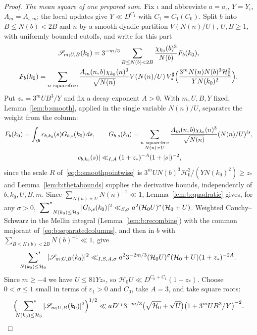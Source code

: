 \begin{proof}
\emph{The mean square of one prepared sum.} Fix $\iota$ and abbreviate $a=a_\iota$, $Y=Y_\iota$, $A_m=A_{\iota,m}$; the local updates give $Y\ll D^{C_1}$ with $C_1=C_1(C_0)$. Split $b$ into $B\le N(b)<2B$ and $n$ by a smooth dyadic partition $V(N(n)/U)$, $U,B\ge1$, with uniformly bounded cutoffs, and write for this part
\[
  \begin{gathered}
  \mathscr S_{m;U,B}(k_0)=3^{-m/3}\sum_{B\le N(b)<2B}\frac{\chi_{k_0}(b)^3}{N(b)}F_b(k_0),\\
  F_b(k_0)=\sum_{n\ {\rm squarefree}}\frac{A_m(n,b)\chi_{k_0}(n)^3}{\sqrt{N(n)}}V(N(n)/U)\,V_*^\sharp\Bigl(\frac{3^mN(n)N(b)^3\mathcal H_0^2}{YN(k_0)^2}\Bigr).
  \end{gathered}
\]
Put $z_*=3^mUB^3/Y$ and fix a decay exponent $A>0$. With $m,U,B,Y$ fixed, Lemma~\ref{lem:b:smooth}, applied in the single variable $N(n)/U$, separates the weight from the column:
\begin{equation}\label{eq:b:separatedcolumns}
  \begin{gathered}
  F_b(k_0)=\int_\R c_{b,k_0}(s)G_{b,s}(k_0)\dd s,\qquad G_{b,s}(k_0)=\sum_{\substack{n\ {\rm squarefree}\\N(n)\asymp U}}\frac{A_m(n,b)\chi_{k_0}(n)^3}{\sqrt{N(n)}}(N(n)/U)^{is},\\
  |c_{b,k_0}(s)|\ll_{I,A}(1+z_*)^{-A}(1+|s|)^{-2},
  \end{gathered}
\end{equation}
since the scale $R$ of~\eqref{eq:b:smoothpointwise} is $3^mUN(b)^3\mathcal H_0^2/(YN(k_0)^2)\ge z_*$ and Lemma~\ref{lem:b:thetabounds} supplies the derivative bounds, independently of $b,k_0,U,B,m$. Since $\sum_{N(n)\asymp U}N(n)^{-1}\ll1$, Lemma~\ref{lem:b:quadratic} gives, for any $\sigma>0$, $\sideset{}{^*}\sum_{N(k_0)\le\mathcal H_0}|G_{b,s}(k_0)|^2\ll_{S,\sigma}a^2(\mathcal H_0U)^\sigma(\mathcal H_0+U)$. Weighted Cauchy--Schwarz in the Mellin integral (Lemma~\ref{lem:b:recombine}) with the common majorant of~\eqref{eq:b:separatedcolumns}, and then in $b$ with $\sum_{B\le N(b)<2B}N(b)^{-1}\ll1$, give
\begin{equation}\label{eq:b:preparedms}
  \sideset{}{^*}\sum_{N(k_0)\le\mathcal H_0}|\mathscr S_{m;U,B}(k_0)|^2\ll_{I,S,A,\sigma}a^23^{-2m/3}(\mathcal H_0U)^\sigma(\mathcal H_0+U)(1+z_*)^{-2A}.
\end{equation}
Since $m\ge-4$ we have $U\le81Yz_*$, so $\mathcal H_0U\ll D^{C_0+C_1}(1+z_*)$. Choose $0<\sigma\le1$ small in terms of $\varepsilon_1>0$ and $C_0$, take $A=3$, and take square roots:
\[
  \Bigl(\sideset{}{^*}\sum_{N(k_0)\le\mathcal H_0}|\mathscr S_{m;U,B}(k_0)|^2\Bigr)^{1/2}\ll aD^{\varepsilon_1}3^{-m/3}\bigl(\sqrt{\mathcal H_0}+\sqrt U\bigr)\bigl(1+3^mUB^3/Y\bigr)^{-2}.
\]
\end{proof}

